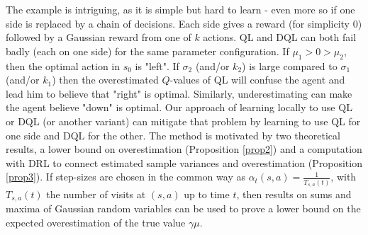 \documentclass{article}
\theoremstyle{plain}
\theoremstyle{definition}
\theoremstyle{remark}
\begin{document}
The example is intriguing, as it is simple but hard to learn - even more so if one side is replaced by a chain of decisions. Each side gives a reward (for simplicity $0$) followed by a Gaussian reward from one of $k$ actions. QL and DQL can both fail badly (each on one side) for the same parameter configuration. If $\mu_1>0>\mu_2$, then the optimal action in $s_0$ is "left". If $\sigma_2$ (and/or $k_2$) is large compared to $\sigma_1$ (and/or $k_1$) then the overestimated $Q$-values of QL will confuse the agent and lead him to believe that "right" is optimal. Similarly, underestimating can make the agent believe "down" is optimal. Our approach of learning locally to use QL or DQL (or another variant) can mitigate that problem by learning to use QL for one side and DQL for the other. The method is motivated by two theoretical results, a lower bound on overestimation (Proposition \ref{prop2}) and a computation with DRL to connect estimated sample variances and overestimation (Proposition \ref{prop3}). 
%
If step-sizes are chosen in the common way as $\alpha_t(s,a)=\frac{1}{T_{s,a}(t)}$, with $T_{s,a}(t)$ the number of visits at $(s,a)$ up to time $t$, then results on sums and maxima of Gaussian random variables can be used to prove a lower bound on the expected overestimation of the true value $\gamma\mu$.
\end{document}
